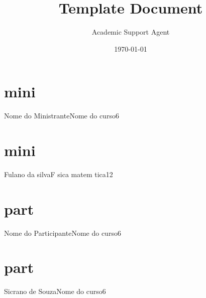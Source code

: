 \documentclass{article}
\title{Template Document}
\author{Academic Support Agent}
\date{\today}
\begin{document}
\maketitle

\pagestyle{empty}
	
	\part{mini}{Nome do Ministrante}{Nome do curso}{6}
	\part{mini}{Fulano da silva}{F sica matem tica}{12}

	\part{part}{Nome do Participante}{Nome do curso}{6}
	\part{part}{Sicrano de Souza}{Nome do curso}{6}
\end{document}
